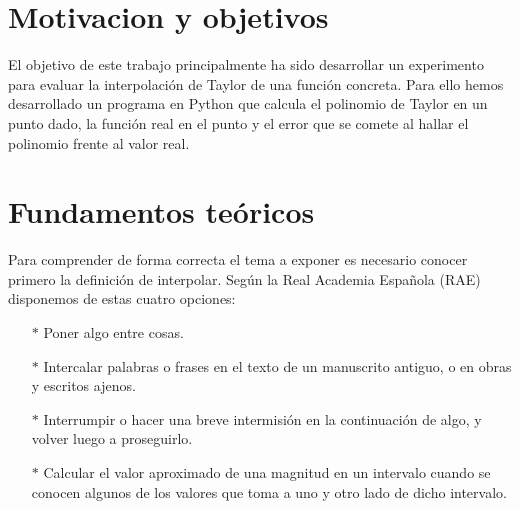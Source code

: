 \documentclass[spanish,a4paper,11pt,twoside]{report}
\begin{document}
\listoftables %










\setlength{\parindent}{5mm}

\chapter{Motivacion y objetivos}
\label{chapter:obj}
El objetivo de este trabajo principalmente ha sido desarrollar un experimento para evaluar la interpolación de Taylor de una función concreta. Para ello hemos desarrollado un programa en Python que calcula el polinomio de Taylor en un punto dado, la función real en el punto y el error que se comete al hallar el polinomio frente al valor real.



\chapter{Fundamentos teóricos}
\label{chapter:teo}

	Para comprender de forma correcta el tema a exponer es necesario conocer primero la definición de interpolar. Según la Real Academia Española (RAE) disponemos de estas cuatro opciones: 
\begin{itemize}
  \item [$*$]
  Poner algo entre cosas.
  \item [$*$]
  Intercalar palabras o frases en el texto de un manuscrito antiguo, o en obras y escritos ajenos.
  \item [$*$]
  Interrumpir o hacer una breve intermisión en la continuación de algo, y volver luego a proseguirlo.
  \item [$*$]
  Calcular el valor aproximado de una magnitud en un intervalo cuando se conocen algunos de los valores que toma a uno y otro lado de dicho intervalo.\\
\end{itemize}
\end{document}
